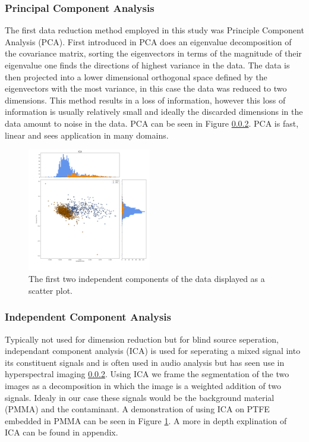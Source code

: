 \documentclass[a4paper,11pt]{article}
\begin{document}
\subsubsection{Principal Component Analysis}

The first data reduction method employed in this study was Principle Component Analysis (PCA). First introduced in PCA does an eigenvalue decomposition of the covariance matrix, sorting the eigenvectors in terms of the magnitude of their eigenvalue one finds the directions of highest variance in the data. The data is then projected into a lower dimensional orthogonal space defined by the eigenvectors with the most variance, in this case the data was reduced to two dimensions. This method results in a loss of information, however this loss of information is usually relatively small and ideally the discarded dimensions in the data amount to noise in the data. PCA can be seen in Figure \ref{}. PCA is fast, linear and sees application in many domains.

\begin{figure}
  \vspace{-20pt}
  \begin{center}
    \includegraphics[width=0.48\textwidth]{figures/ICAnone.png}
  \end{center}
  \vspace{-20pt}
  \caption{The first two independent components of the data displayed as a scatter plot.}
  \vspace{-10pt}
  \label{ICA}
\end{figure}

\subsubsection{Independent Component Analysis}

Typically not used for dimension reduction but for blind source seperation, independant component analysis (ICA) is used for seperating a mixed signal into its constituent signals and is often used in audio analysis but has seen use in hyperspectral imaging \ref{}. Using ICA we frame the segmentation of the two images as a decomposition in which the image is a weighted addition of two signals. Idealy in our case these signals would be the background material (PMMA) and the contaminant. A demonstration of using ICA on PTFE embedded in PMMA can be seen in Figure \ref{ICA}. A more in depth explination of ICA can be found in appendix.
\end{document}
